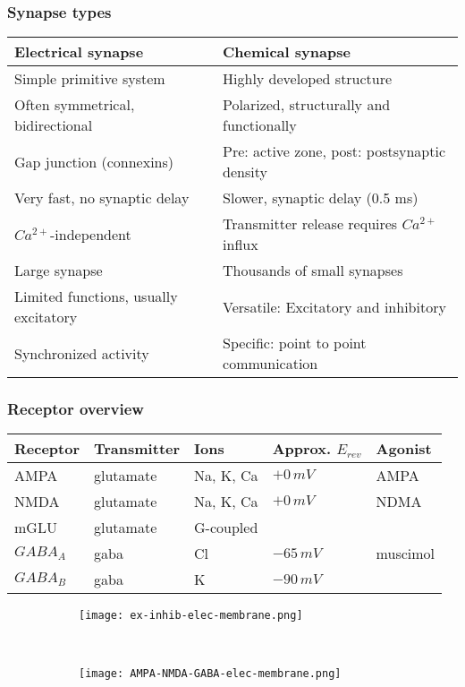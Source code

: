 \documentclass[main]{subfiles}
\begin{document}
\subsubsection{Synapse types}
\begin{tabular}{|l|l|}
	\hline
	\textbf{Electrical synapse} & \textbf{Chemical synapse}\\\hline
	Simple primitive system & Highly developed structure\\\hline
	Often symmetrical, bidirectional & Polarized, structurally and functionally\\\hline
	Gap junction (connexins) & Pre: active zone, post: postsynaptic density\\\hline
	Very fast, no synaptic delay & Slower, synaptic delay (0.5 ms)\\\hline
	$Ca^{2+}$-independent & Transmitter release requires $Ca^{2+}$ influx\\\hline
	Large synapse & Thousands of small synapses\\\hline
	Limited functions, usually excitatory & Versatile: Excitatory and inhibitory\\\hline
	Synchronized activity & Specific: point to point communication\\\hline
\end{tabular}

\subsubsection{Receptor overview}
\begin{tabular}{|l|l|l|l|l|}
	\hline
	\textbf{Receptor} & \textbf{Transmitter} & \textbf{Ions} & \textbf{Approx. $E_{rev}$} & \textbf{Agonist}\\\hline
	AMPA & glutamate & Na, K, Ca & $+0\,mV$ & AMPA\\\hline
	NMDA & glutamate & Na, K, Ca & $+0\,mV$ & NDMA\\\hline
	mGLU & glutamate & G-coupled & & \\\hline
	$GABA_A$ & gaba & Cl & $-65\,mV$ & muscimol\\\hline
	$GABA_B$ & gaba & K & $-90\,mV$ & \\\hline
\end{tabular}

\begin{figure}[H]
	\centering
	\begin{subfigure}[b]{0.5\textwidth}
    	\centering
		\texttt{[image: ex-inhib-elec-membrane.png]}
	\end{subfigure}%
	~
	\begin{subfigure}[b]{0.5\textwidth}
		\centering
		\texttt{[image: AMPA-NMDA-GABA-elec-membrane.png]}
	\end{subfigure}
\end{figure}
\end{document}
